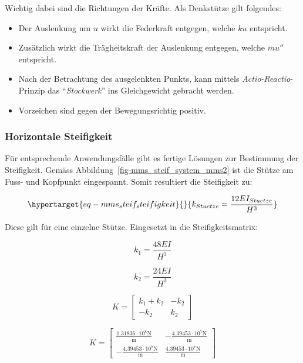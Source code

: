 \documentclass[
  letterpaper,
  DIV=11]{scrreprt}
\providecommand{\tightlist}{%
  \setlength{\itemsep}{0pt}\setlength{\parskip}{0pt}}\usepackage{longtable,booktabs,array}
\begin{document}
Wichtig dabei sind die Richtungen der Kräfte. Als Denkstütze gilt
folgendes:

\begin{itemize}
\tightlist
\item
  Der Auslenkung um \(u\) wirkt die Federkraft entgegen, welche \(k u\)
  entspricht.
\item
  Zusätzlich wirkt die Trägheitskraft der Auslenkung entgegen, welche
  \(m u''\) entspricht.
\item
  Nach der Betrachtung des ausgelenkten Punkts, kann mittels
  \emph{Actio-Reactio}-Prinzip das ``\emph{Stockwerk}'' ins
  Gleichgewicht gebracht werden.
\item
  Vorzeichen sind gegen der Bewegungsrichtig positiv.
\end{itemize}

\hypertarget{horizontale-steifigkeit-2}{%
\subsubsection{Horizontale
Steifigkeit}\label{horizontale-steifigkeit-2}}

Für entsprechende Anwendungsfälle gibt es fertige Lösungen zur
Bestimmung der Steifigkeit. Gemäss
Abbildung~\ref{fig-mms_steif_system_mms2} ist die Stütze am Fuss- und
Kopfpunkt eingespannt. Somit resultiert die Steifigkeit zu:

\begin{equation}\protect\hypertarget{eq-mms_steif_steifigkeit}{}{
k_{Stuetze} = \frac{12EI_{Stuetze}}{H^3}
}\label{eq-mms_steif_steifigkeit}\end{equation}

Diese gilt für eine einzelne Stütze. Eingesetzt in die
Steifigkeitsmatrix:

\begin{equation}k_{1} = \frac{48 E I}{H^{3}}\end{equation}

\begin{equation}k_{2} = \frac{24 E I}{H^{3}}\end{equation}

\begin{equation}K = \left[\begin{matrix}k_{1} + k_{2} & - k_{2}\\- k_{2} & k_{2}\end{matrix}\right]\end{equation}

\begin{equation}K = \left[\begin{matrix}\frac{1.31836 \cdot 10^{8} \text{N}}{\text{m}} & - \frac{4.39453 \cdot 10^{7} \text{N}}{\text{m}}\\- \frac{4.39453 \cdot 10^{7} \text{N}}{\text{m}} & \frac{4.39453 \cdot 10^{7} \text{N}}{\text{m}}\end{matrix}\right]\end{equation}
\end{document}

